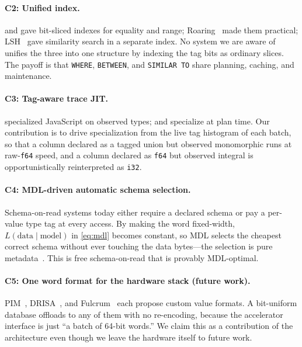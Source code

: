 \documentclass[10pt]{article}
\begin{document}
\paragraph{C2: Unified index.}
\citet{oneil1997improved} and \citet{chan1998bitmap} gave bit-sliced
indexes for equality and range; Roaring~\citep{chambi2016roaring} made
them practical; LSH~\citep{andoni2008near} gave similarity search in
a separate index. No system we are aware of unifies the three into one
structure by indexing the tag bits as ordinary slices. The payoff is
that \texttt{WHERE}, \texttt{BETWEEN}, and \texttt{SIMILAR TO} share
planning, caching, and maintenance.

\paragraph{C3: Tag-aware trace JIT.}
\citet{gal2009trace} specialized JavaScript on observed types;
\citet{neumann2011hyper} and \citet{boncz2005monetdb} specialize at
plan time. Our contribution is to drive specialization from the live
tag histogram of each batch, so that a column declared as a tagged
union but observed monomorphic runs at raw-\texttt{f64} speed, and a
column declared as \texttt{f64} but observed integral is
opportunistically reinterpreted as \texttt{i32}.

\paragraph{C4: MDL-driven automatic schema selection.}
Schema-on-read systems today either require a declared schema or pay a
per-value type tag at every access. By making the word fixed-width,
$L(\text{data}\mid\text{model})$ in \cref{eq:mdl} becomes constant, so
MDL selects the cheapest correct schema without ever touching the data
bytes---the selection is pure metadata~\citep{grunwald2004mdl}. This is
free schema-on-read that is provably MDL-optimal.

\paragraph{C5: One word format for the hardware stack (future work).}
PIM~\citep{gomez2023benchmarking}, DRISA~\citep{li2017drisa}, and
Fulcrum~\citep{seshadri2017fulcrum} each propose custom value formats.
A bit-uniform database offloads to any of them with no re-encoding,
because the accelerator interface is just ``a batch of 64-bit words.''
We claim this as a contribution of the architecture even though we
leave the hardware itself to future work.
\end{document}
